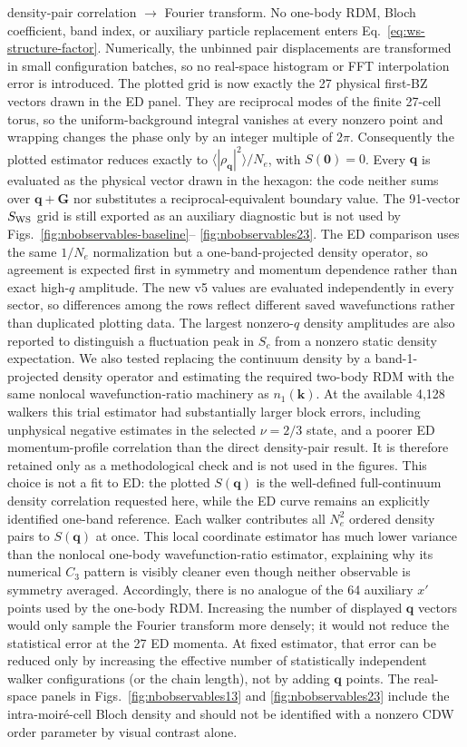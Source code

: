 density-pair correlation $\rightarrow$ Fourier transform. No one-body RDM,
Bloch coefficient, band index, or auxiliary particle replacement enters
Eq.~\eqref{eq:ws-structure-factor}. Numerically, the unbinned pair
displacements are transformed in
small configuration batches, so no real-space histogram or FFT interpolation
error is introduced. The plotted grid is now exactly the 27 physical first-BZ
vectors drawn in the ED panel. They are reciprocal modes of the finite
27-cell torus, so the uniform-background integral vanishes at every nonzero
point and wrapping changes the phase only by an integer multiple of $2\pi$.
Consequently the plotted estimator reduces exactly to
$\langle|\rho_{\bm q}|^2\rangle/N_e$, with $S(\bm0)=0$. Every $\bm q$ is
evaluated as the physical vector drawn in the hexagon: the code neither sums
over $\bm q+\bm G$ nor substitutes a reciprocal-equivalent boundary value.
The 91-vector $S_{\rm WS}$ grid is still exported as an auxiliary diagnostic
but is not used by Figs.~\ref{fig:nbobservables-baseline}--
\ref{fig:nbobservables23}.
The ED comparison uses the same $1/N_e$ normalization but a one-band-projected
density operator, so agreement is expected first in symmetry and momentum
dependence rather than exact high-$q$ amplitude. The new
v5 values are evaluated independently in every sector, so differences among
the rows reflect different saved wavefunctions rather than duplicated plotting
data. The largest nonzero-$q$ density amplitudes are also reported to
distinguish a fluctuation peak in $S_c$ from a nonzero static density
expectation.
We also tested replacing the continuum density by a band-1-projected density
operator and estimating the required two-body RDM with the same nonlocal
wavefunction-ratio machinery as $n_1(\bm k)$. At the available 4,128 walkers
this trial estimator had substantially larger block errors, including
unphysical negative estimates in the selected $\nu=2/3$ state, and a poorer
ED momentum-profile correlation than the direct density-pair result. It is
therefore retained only as a methodological check and is not used in the
figures. This choice is not a fit to ED: the plotted $S(\bm q)$ is the
well-defined full-continuum density correlation requested here, while the ED
curve remains an explicitly identified one-band reference.
Each walker contributes all $N_e^2$ ordered density pairs to $S(\bm q)$ at
once. This local coordinate estimator has much lower variance than the
nonlocal one-body wavefunction-ratio estimator, explaining why its numerical
$C_3$ pattern is visibly cleaner even though neither observable is symmetry
averaged. Accordingly, there is no analogue of the 64 auxiliary $x'$ points
used by the one-body RDM. Increasing the number of displayed $\bm q$ vectors
would only sample the Fourier transform more densely; it would not reduce the
statistical error at the 27 ED momenta. At fixed estimator, that error can be
reduced only by increasing the effective number of statistically independent
walker configurations (or the chain length), not by adding $\bm q$ points.
The real-space panels in Figs.~\ref{fig:nbobservables13} and
\ref{fig:nbobservables23} include the intra-moir\'e-cell Bloch density and
should not be identified with a nonzero CDW order parameter by visual
contrast alone.

